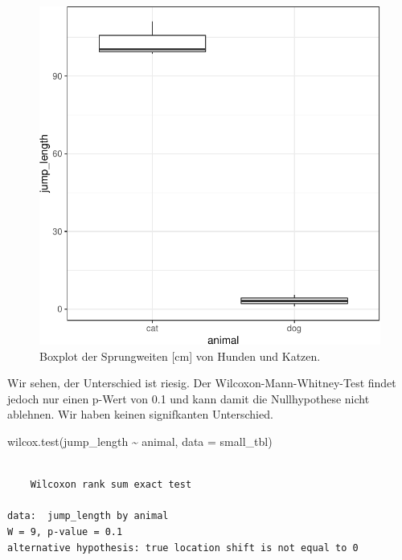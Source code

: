 \documentclass[
  letterpaper,
  DIV=11,
  oneside]{scrreport}
\newenvironment{Shaded}{\begin{snugshade}}{\end{snugshade}}
\newcommand{\AttributeTok}[1]{\textcolor[rgb]{0.40,0.45,0.13}{#1}}
\newcommand{\FunctionTok}[1]{\textcolor[rgb]{0.28,0.35,0.67}{#1}}
\newcommand{\NormalTok}[1]{\textcolor[rgb]{0.00,0.23,0.31}{#1}}
\newcommand{\SpecialCharTok}[1]{\textcolor[rgb]{0.37,0.37,0.37}{#1}}
\begin{document}
\begin{figure}

{\centering \includegraphics{./stat-tests-utest_files/figure-pdf/fig-boxplot-utest-min-1.pdf}

}

\caption{\label{fig-boxplot-utest-min}Boxplot der Sprungweiten {[}cm{]}
von Hunden und Katzen.}

\end{figure}

Wir sehen, der Unterschied ist riesig. Der Wilcoxon-Mann-Whitney-Test
findet jedoch nur einen p-Wert von 0.1 und kann damit die Nullhypothese
nicht ablehnen. Wir haben keinen signifkanten Unterschied.

\begin{Shaded}
\begin{Highlighting}[]
\FunctionTok{wilcox.test}\NormalTok{(jump\_length }\SpecialCharTok{\textasciitilde{}}\NormalTok{ animal, }\AttributeTok{data =}\NormalTok{ small\_tbl)}
\end{Highlighting}
\end{Shaded}

\begin{verbatim}

    Wilcoxon rank sum exact test

data:  jump_length by animal
W = 9, p-value = 0.1
alternative hypothesis: true location shift is not equal to 0
\end{verbatim}
\end{document}
